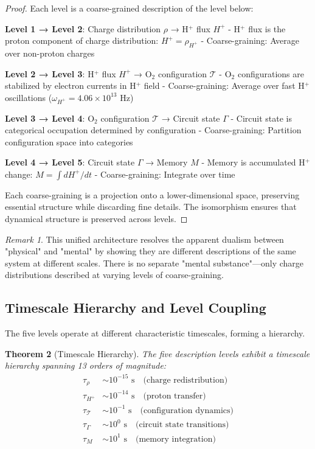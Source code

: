 \documentclass[aps,prd,twocolumn,superscriptaddress,floatfix,nofootinbib]{revtex4-2}
\newtheorem{theorem}{Theorem}[section]
\theoremstyle{remark}
\newtheorem{remark}[theorem]{Remark}
\begin{document}
\begin{proof}
Each level is a coarse-grained description of the level below:

\textbf{Level 1 → Level 2}: Charge distribution $\rho$ → H$^+$ flux $H^+$
- H$^+$ flux is the proton component of charge distribution: $H^+ = \rho_{H^+}$
- Coarse-graining: Average over non-proton charges

\textbf{Level 2 → Level 3}: H$^+$ flux $H^+$ → O$_2$ configuration $\mathcal{T}$
- O$_2$ configurations are stabilized by electron currents in H$^+$ field
- Coarse-graining: Average over fast H$^+$ oscillations ($\omega_{H^+} = 4.06 \times 10^{13}$ Hz)

\textbf{Level 3 → Level 4}: O$_2$ configuration $\mathcal{T}$ → Circuit state $\Gamma$
- Circuit state is categorical occupation determined by configuration
- Coarse-graining: Partition configuration space into categories

\textbf{Level 4 → Level 5}: Circuit state $\Gamma$ → Memory $M$
- Memory is accumulated H$^+$ change: $M = \int dH^+/dt$
- Coarse-graining: Integrate over time

Each coarse-graining is a projection onto a lower-dimensional space, preserving essential structure while discarding fine details. The isomorphism ensures that dynamical structure is preserved across levels.
\end{proof}

\begin{remark}
This unified architecture resolves the apparent dualism between "physical" and "mental" by showing they are different descriptions of the same system at different scales. There is no separate "mental substance"—only charge distributions described at varying levels of coarse-graining.
\end{remark}

\subsection{Timescale Hierarchy and Level Coupling}

The five levels operate at different characteristic timescales, forming a hierarchy.

\begin{theorem}[Timescale Hierarchy]
\label{thm:timescale_hierarchy}
The five description levels exhibit a timescale hierarchy spanning 13 orders of magnitude:
\begin{align}
\tau_{\rho} &\sim 10^{-15} \text{ s} \quad \text{(charge redistribution)} \\
\tau_{H^+} &\sim 10^{-14} \text{ s} \quad \text{(proton transfer)} \\
\tau_{\mathcal{T}} &\sim 10^{-1} \text{ s} \quad \text{(configuration dynamics)} \\
\tau_{\Gamma} &\sim 10^{0} \text{ s} \quad \text{(circuit state transitions)} \\
\tau_{M} &\sim 10^{1} \text{ s} \quad \text{(memory integration)}
\end{align}
\end{theorem}
\end{document}
